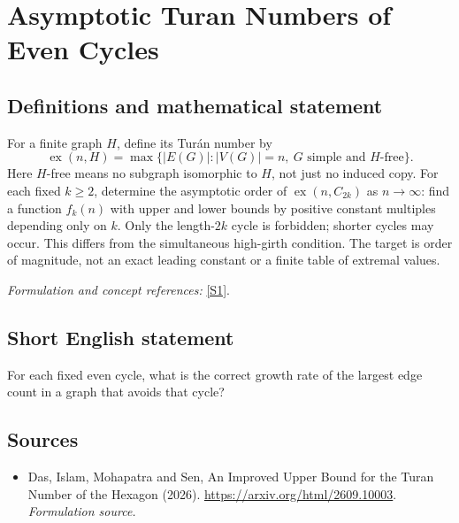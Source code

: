 \documentclass[11pt]{article}
\begin{document}
\section*{\texorpdfstring{Asymptotic Turan Numbers of Even Cycles}{Asymptotic Turan Numbers of Even Cycles}}\label{362}
\subsection{Definitions and mathematical statement}
For a finite graph $H$, define its Tur\'an number by
\[
 \operatorname{ex}(n,H)=\max\{|E(G)|:|V(G)|=n,\ G\text{ simple and }H\text{-free}\}.
\]
Here $H$-free means no subgraph isomorphic to $H$, not just no induced copy. For each fixed $k\ge2$, determine the asymptotic order of $\operatorname{ex}(n,C_{2k})$ as $n\to\infty$: find a function $f_k(n)$ with upper and lower bounds by positive constant multiples depending only on $k$. Only the length-$2k$ cycle is forbidden; shorter cycles may occur. This differs from the simultaneous high-girth condition. The target is order of magnitude, not an exact leading constant or a finite table of extremal values.
\par\smallskip\textit{Formulation and concept references:} \href{https://arxiv.org/html/2609.10003}{[S1]}.

\subsection{Short English statement}
For each fixed even cycle, what is the correct growth rate of the largest edge count in a graph that avoids that cycle?
\subsection{Sources}
\begin{itemize}
\item[S1]Das, Islam, Mohapatra and Sen, An Improved Upper Bound for the Turan Number of the Hexagon (2026).
\url{https://arxiv.org/html/2609.10003}.
\textit{Formulation source.}
\end{itemize}
\end{document}
